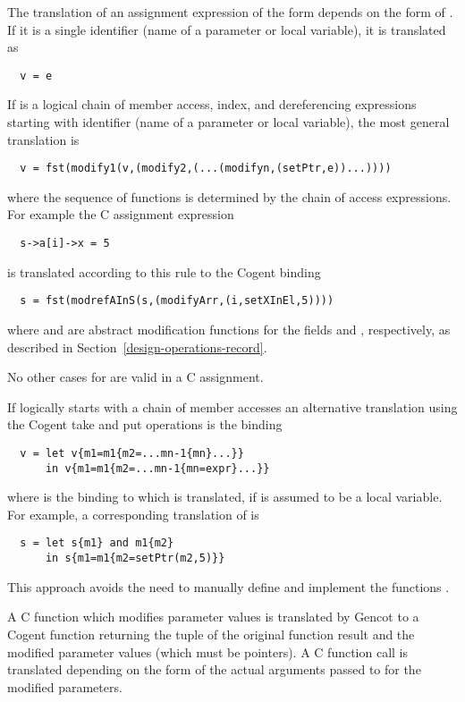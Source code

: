 The translation of an assignment expression of the form  depends on the form of . If it is
a single identifier  (name of a parameter or local variable), it is translated as
\begin{verbatim}
  v = e
\end{verbatim}
If  is a logical chain of member access, index, and dereferencing expressions starting with identifier  
(name of a parameter or local variable), the most general translation is
\begin{verbatim}
  v = fst(modify1(v,(modify2,(...(modifyn,(setPtr,e))...))))
\end{verbatim}
where the sequence of  functions is determined by the chain of access expressions.
For example the C assignment expression
\begin{verbatim}
  s->a[i]->x = 5
\end{verbatim}
is translated according to this rule to the Cogent binding
\begin{verbatim}
  s = fst(modrefAInS(s,(modifyArr,(i,setXInEl,5))))
\end{verbatim}
where  and  are abstract modification functions for the fields  and ,
respectively, as described in Section~\ref{design-operations-record}.

No other cases for  are valid in a C assignment.

If  logically starts with a chain of member accesses  an alternative translation using the Cogent
take and put operations is the binding
\begin{verbatim}
  v = let v{m1=m1{m2=...mn-1{mn}...}} 
      in v{m1=m1{m2=...mn-1{mn=expr}...}}
\end{verbatim}
where  is the binding to which  is translated, if  is assumed to be a local variable. 
For example, a corresponding translation of  is
\begin{verbatim}
  s = let s{m1} and m1{m2}
      in s{m1=m1{m2=setPtr(m2,5)}}
\end{verbatim}
This approach avoids the need to manually define and implement the functions .

A C function which modifies parameter values is translated by Gencot to a Cogent function returning the tuple 
of the original function result  and the modified parameter values  (which must be pointers). 
A C function call  is
translated depending on the form of the actual arguments passed to  for the modified parameters.

